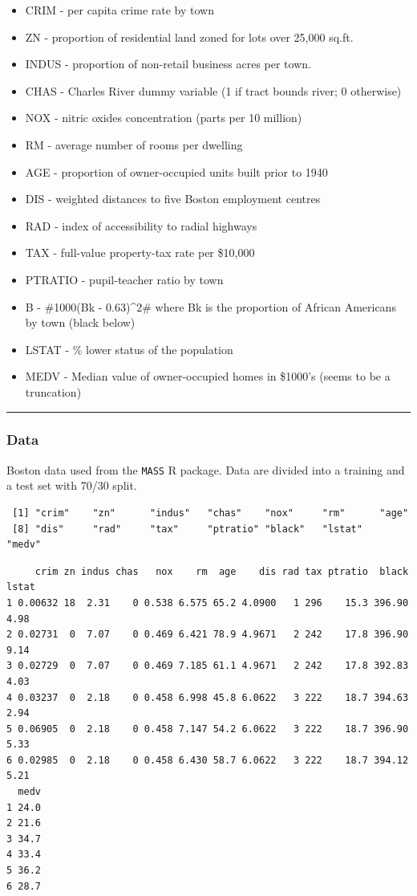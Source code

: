 \documentclass[
  letterpaper,
  DIV=11,
  numbers=noendperiod]{scrartcl}
\providecommand{\tightlist}{%
  \setlength{\itemsep}{0pt}\setlength{\parskip}{0pt}}\usepackage{longtable,booktabs,array}
\begin{document}
\begin{itemize}
\tightlist
\item
  CRIM - per capita crime rate by town
\item
  ZN - proportion of residential land zoned for lots over 25,000 sq.ft.
\item
  INDUS - proportion of non-retail business acres per town.
\item
  CHAS - Charles River dummy variable (1 if tract bounds river; 0
  otherwise)
\item
  NOX - nitric oxides concentration (parts per 10 million)
\item
  RM - average number of rooms per dwelling
\item
  AGE - proportion of owner-occupied units built prior to 1940
\item
  DIS - weighted distances to five Boston employment centres
\item
  RAD - index of accessibility to radial highways
\item
  TAX - full-value property-tax rate per \$10,000
\item
  PTRATIO - pupil-teacher ratio by town
\item
  B - \#1000(Bk - 0.63)\^{}2\# where Bk is the proportion of African
  Americans by town (black below)
\item
  LSTAT - \% lower status of the population
\item
  MEDV - Median value of owner-occupied homes in \$1000's (seems to be a
  truncation)
\end{itemize}

\begin{center}\rule{0.5\linewidth}{0.5pt}\end{center}

\hypertarget{data}{%
\subsubsection{Data}\label{data}}

Boston data used from the \texttt{MASS} R package. Data are divided into
a training and a test set with 70/30 split.

\begin{verbatim}
 [1] "crim"    "zn"      "indus"   "chas"    "nox"     "rm"      "age"    
 [8] "dis"     "rad"     "tax"     "ptratio" "black"   "lstat"   "medv"   
\end{verbatim}

\begin{verbatim}
     crim zn indus chas   nox    rm  age    dis rad tax ptratio  black lstat
1 0.00632 18  2.31    0 0.538 6.575 65.2 4.0900   1 296    15.3 396.90  4.98
2 0.02731  0  7.07    0 0.469 6.421 78.9 4.9671   2 242    17.8 396.90  9.14
3 0.02729  0  7.07    0 0.469 7.185 61.1 4.9671   2 242    17.8 392.83  4.03
4 0.03237  0  2.18    0 0.458 6.998 45.8 6.0622   3 222    18.7 394.63  2.94
5 0.06905  0  2.18    0 0.458 7.147 54.2 6.0622   3 222    18.7 396.90  5.33
6 0.02985  0  2.18    0 0.458 6.430 58.7 6.0622   3 222    18.7 394.12  5.21
  medv
1 24.0
2 21.6
3 34.7
4 33.4
5 36.2
6 28.7
\end{verbatim}
\end{document}
